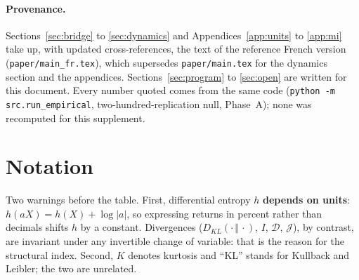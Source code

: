 \documentclass[11pt]{article}
\theoremstyle{definition}
\theoremstyle{remark}
\newcommand{\JJ}{\mathcal{J}}
\newcommand{\DD}{\mathcal{D}}
\newcommand{\KL}[2]{D_{KL}\!\left(#1\,\Vert\,#2\right)}
\begin{document}
\paragraph{Provenance.} Sections~\ref{sec:bridge} to \ref{sec:dynamics} and
Appendices~\ref{app:units} to \ref{app:mi} take up, with updated
cross-references, the text of the reference French version
(\texttt{paper/main\_fr.tex}), which supersedes \texttt{paper/main.tex} for
the dynamics section and the appendices. Sections~\ref{sec:program} to
\ref{sec:open} are written for this document. Every number quoted comes from the
same code (\texttt{python -m src.run\_empirical}, two-hundred-replication null,
Phase~A); none was recomputed for this supplement.

\section*{Notation}

\noindent Two warnings before the table. First, differential entropy $h$
\textbf{depends on units}: $h(aX)=h(X)+\log|a|$, so expressing returns in
percent rather than decimals shifts $h$ by a constant. Divergences
($\KL{\cdot}{\cdot}$, $I$, $\DD$, $\JJ$), by contrast, are invariant under any
invertible change of variable: that is the reason for the structural index.
Second, $K$ denotes kurtosis and ``KL'' stands for Kullback and Leibler; the two
are unrelated.
\end{document}
